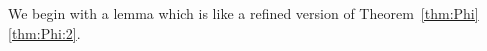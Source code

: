 \documentclass[12pt]{amsart}
\newtheorem{lemma}{Lemma}[section]
\theoremstyle{definition}
\theoremstyle{remark}
\newcommand{\PP}{\mathbb{P}}
\newcommand{\cc}{c}
\newcommand{\cE}{\mathcal{E}}
\newcommand{\FF}{\mathbf{F}}
\newcommand{\DD}{\mathrm{D}}
\begin{document}
We begin with a lemma which is like a refined version of Theorem~\ref{thm:Phi}\eqref{thm:Phi:2}.  


\end{document}
